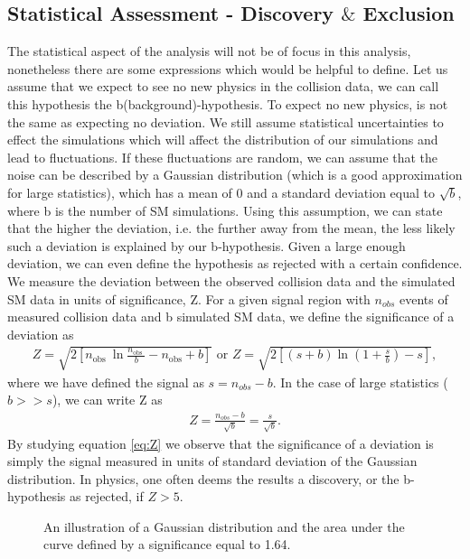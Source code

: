 \subsection{Statistical Assessment - Discovery $\&$ Exclusion}\label{subsec:Sensitivity}
The statistical aspect of the analysis will not be of focus in this analysis, nonetheless there are 
some expressions which would be helpful to define. Let us assume that we expect to see no new physics in the collision
data, we can call this hypothesis the b(background)-hypothesis. To expect no new physics, is not the same as expecting no 
deviation. We still assume statistical uncertainties to effect the simulations which will affect the distribution of our 
simulations and lead to fluctuations. If these fluctuations are random, we can assume that the noise can be described by a Gaussian distribution 
(which is a good approximation for large statistics), which has a mean of 0 and a standard deviation equal to $\sqrt{b}$, where b is 
the number of \ac{SM} simulations. Using this assumption, we can state that the higher the deviation, i.e. the further away 
from the mean, the less likely such a deviation is explained by our b-hypothesis. Given a large enough deviation, we can even 
define the hypothesis as rejected with a certain confidence.
\\
We measure the deviation between the observed collision data and the simulated \ac{SM} data in units of significance, Z. 
For a given signal region with $n_{obs}$ events of measured collision data and b simulated \ac{SM} data, we define
the significance of a deviation as
\begin{align}\label{eq:Z1}
Z=\sqrt{2\left[n_{\text {obs }} \ln \frac{n_{\text {obs }}}{b}-n_{\mathrm{obs}}+b\right]} \text { or } 
Z=\sqrt{2\left[(s+b) \ln \left(1+\frac{s}{b}\right)-s\right]}, 
\end{align}
where we have defined the signal as $s = n_{obs} - b$. In the case of large statistics ($b>>s$), we can write Z 
as 
\begin{align}\label{eq:Z}
    Z=\frac{n_{o b s}-b}{\sqrt{b}} = \frac{s}{\sqrt{b}}.
\end{align}
By studying equation \ref{eq:Z} we observe that the significance of a deviation is simply the signal measured in units of standard
deviation of the Gaussian distribution. In physics, one often deems the results a discovery, or the b-hypothesis as rejected, if $Z>5$. 
\\
\begin{figure}[H]
    \centering
    \caption{An illustration of a Gaussian distribution and the area under the curve defined by a significance equal to 1.64.}
    \label{fig:ConfInt}
\end{figure}
